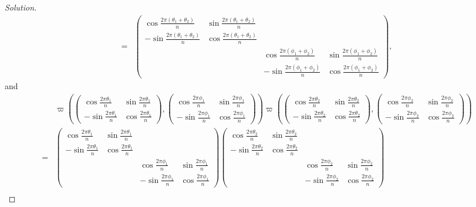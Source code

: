 \documentclass{article}
\theoremstyle{definition}
\theoremstyle{plain}
\begin{document}
\begin{adjustwidth}{0.7cm}{}
\begin{proof}[Solution]
\begin{align*}
=&\begin{pmatrix}\cos\frac{2\pi(\theta_1+\theta_2)}{n}&\sin\frac{2\pi(\theta_1+\theta_2)}{n}&&\\ -\sin\frac{2\pi(\theta_1+\theta_2)}{n}&\cos\frac{2\pi(\theta_1+\theta_2)}{n}&&\\ &&\cos\frac{2\pi(\phi_1+\phi_2)}{n}&\sin\frac{2\pi(\phi_1+\phi_2)}{n}\\ &&-\sin\frac{2\pi(\phi_1+\phi_2)}{n}&\cos\frac{2\pi(\phi_1+\phi_2)}{n}\end{pmatrix},
\end{align*}
and
\begin{align*}
&\varpi\left(\begin{pmatrix}\cos\frac{2\pi\theta_1}{n}&\sin\frac{2\pi\theta_1}{n}\\ -\sin\frac{2\pi\theta_1}{n}&\cos\frac{2\pi\theta_1}{n}\end{pmatrix},\begin{pmatrix}\cos\frac{2\pi\phi_1}{n}&\sin\frac{2\pi\phi_1}{n}\\ -\sin\frac{2\pi\phi_1}{n}&\cos\frac{2\pi\phi_1}{n}\end{pmatrix}\right)\varpi\left(\begin{pmatrix}\cos\frac{2\pi\theta_2}{n}&\sin\frac{2\pi\theta_2}{n}\\ -\sin\frac{2\pi\theta_2}{n}&\cos\frac{2\pi\theta_2}{n}\end{pmatrix},\begin{pmatrix}\cos\frac{2\pi\phi_2}{n}&\sin\frac{2\pi\phi_2}{n}\\ -\sin\frac{2\pi\phi_2}{n}&\cos\frac{2\pi\phi_2}{n}\end{pmatrix}\right)\\
=&\begin{pmatrix}\cos\frac{2\pi\theta_1}{n}&\sin\frac{2\pi\theta_1}{n}&&\\ -\sin\frac{2\pi\theta_1}{n}&\cos\frac{2\pi\theta_1}{n}&&\\ &&\cos\frac{2\pi\phi_1}{n}&\sin\frac{2\pi\phi_1}{n}\\ &&-\sin\frac{2\pi\phi_1}{n}&\cos\frac{2\pi\phi_1}{n}\end{pmatrix}\begin{pmatrix}\cos\frac{2\pi\theta_2}{n}&\sin\frac{2\pi\theta_2}{n}&&\\ -\sin\frac{2\pi\theta_2}{n}&\cos\frac{2\pi\theta_2}{n}&&\\ &&\cos\frac{2\pi\phi_2}{n}&\sin\frac{2\pi\phi_2}{n}\\ &&-\sin\frac{2\pi\phi_2}{n}&\cos\frac{2\pi\phi_2}{n}\end{pmatrix}\\

\end{align*}
\end{proof}
\end{adjustwidth}
\end{document}

